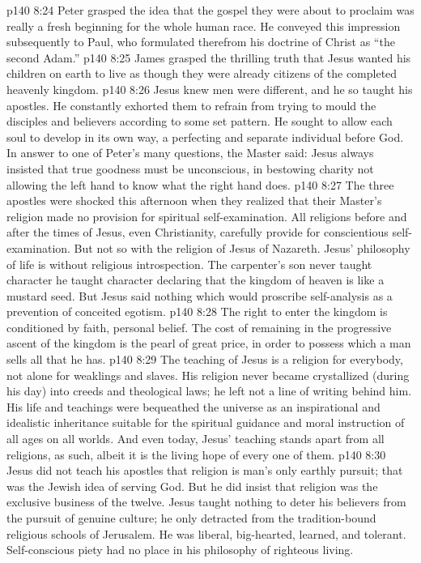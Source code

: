 \vs p140 8:24 Peter grasped the idea that the gospel they were about to proclaim was really a fresh beginning for the whole human race. He conveyed this impression subsequently to Paul, who formulated therefrom his doctrine of Christ as “the second Adam.”
\vs p140 8:25 James grasped the thrilling truth that Jesus wanted his children on earth to live as though they were already citizens of the completed heavenly kingdom.
\vs p140 8:26 \pc Jesus knew men were different, and he so taught his apostles. He constantly exhorted them to refrain from trying to mould the disciples and believers according to some set pattern. He sought to allow each soul to develop in its own way, a perfecting and separate individual before God. In answer to one of Peter’s many questions, the Master said:  Jesus always insisted that true goodness must be unconscious, in bestowing charity not allowing the left hand to know what the right hand does.
\vs p140 8:27 The three apostles were shocked this afternoon when they realized that their Master’s religion made no provision for spiritual self\hyp{}examination. All religions before and after the times of Jesus, even Christianity, carefully provide for conscientious self\hyp{}examination. But not so with the religion of Jesus of Nazareth. Jesus’ philosophy of life is without religious introspection. The carpenter’s son never taught character  he taught character  declaring that the kingdom of heaven is like a mustard seed. But Jesus said nothing which would proscribe self\hyp{}analysis as a prevention of conceited egotism.
\vs p140 8:28 The right to enter the kingdom is conditioned by faith, personal belief. The cost of remaining in the progressive ascent of the kingdom is the pearl of great price, in order to possess which a man sells all that he has.
\vs p140 8:29 The teaching of Jesus is a religion for everybody, not alone for weaklings and slaves. His religion never became crystallized (during his day) into creeds and theological laws; he left not a line of writing behind him. His life and teachings were bequeathed the universe as an inspirational and idealistic inheritance suitable for the spiritual guidance and moral instruction of all ages on all worlds. And even today, Jesus’ teaching stands apart from all religions, as such, albeit it is the living hope of every one of them.
\vs p140 8:30 Jesus did not teach his apostles that religion is man’s only earthly pursuit; that was the Jewish idea of serving God. But he did insist that religion was the exclusive business of the twelve. Jesus taught nothing to deter his believers from the pursuit of genuine culture; he only detracted from the tradition\hyp{}bound religious schools of Jerusalem. He was liberal, big\hyp{}hearted, learned, and tolerant. Self\hyp{}conscious piety had no place in his philosophy of righteous living.
